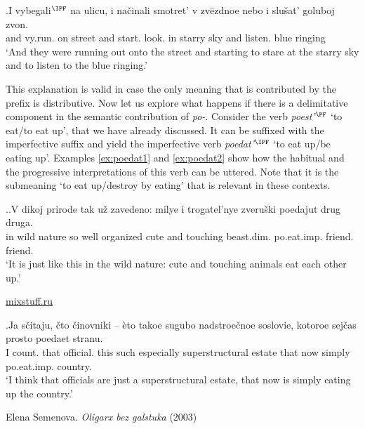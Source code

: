 \exg.\label{ex:vybegat}I vybegali$^{\IPF}$ na ulicu, i na\v{c}inali smotret' v zv\"{e}zdnoe nebo i slu\v{s}at' goluboj zvon.\\
and vy.run. on street and start. look. in starry sky and listen. blue ringing\\
\vspace{0.5em}
`And they were running out onto the street and starting to stare at the starry sky and to listen to the blue ringing.'

This explanation is valid in case the only meaning that is contributed by the prefix is distributive. Now let us explore what happens if there is a delimitative component in the semantic contribution of \textit{po-}. Consider the verb \textit{poest'$^{\PF}$} `to eat/to eat up', that we have already discussed. It can be suffixed with the imperfective suffix and yield the imperfective verb \textit{poedat'$^{\IPF}$} `to eat up/be eating up'. Examples \ref{ex:poedat1} and \ref{ex:poedat2} show how the habitual and the progressive interpretations of this verb can be uttered. Note that it is the submeaning `to eat up/destroy by eating' that is relevant in these contexts.

\ex.\ag.\label{ex:poedat1}V dikoj prirode tak u\v{z} zavedeno: milye i trogatel'nye zveru\v{s}ki poedajut drug druga.\\
in wild nature so well organized cute and touching beast.dim. po.eat.imp. friend. friend.\\
\vspace{0.5em}
`It is just like this in the wild nature: cute and touching animals eat each other up.'
\begin{flushright}
\vspace{-0.5em}
\url{mixstuff.ru}
\end{flushright}
\bg.\label{ex:poedat2}Ja s\v{c}itaju, \v{c}to \v{c}inovniki -- \`{e}to takoe sugubo nadstroe\v{c}noe soslovie, kotoroe sej\v{c}as prosto poedaet stranu.\\
I count. that official. {} this such especially superstructural estate that now simply po.eat.imp. country.\\
\vspace{0.5em}
`I think that officials are just a superstructural estate, that now is simply eating up the country.'
\begin{flushright}
\vspace{-0.5em}
Elena Semenova. \textit{Oligarx bez galstuka} (2003)
\end{flushright}

